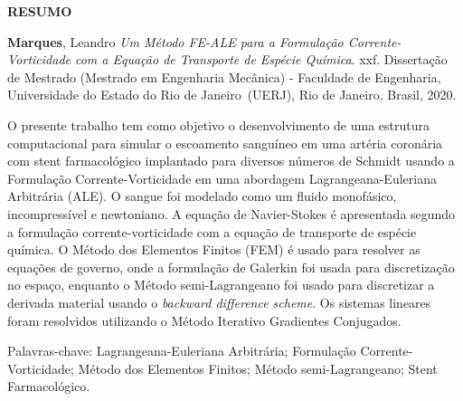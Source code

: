 \begin{center}
\textbf{RESUMO}
\end{center}


$\!$\\

\hspace{-1.3cm}\textbf{Marques}, Leandro \textit{Um Método FE-ALE para a Formulação Corrente-Vorticidade com a Equação de Transporte de Espécie Química}. xxf. Dissertação de Mestrado (Mestrado em Engenharia Mecânica) - Faculdade de Engenharia, Universidade do Estado do Rio de Janeiro~(UERJ), Rio de Janeiro, Brasil, 2020.

\vspace{.2cm}

\indent 
O presente trabalho tem como objetivo o desenvolvimento 
de uma estrutura computacional para simular o escoamento 
sanguíneo em uma artéria coronária com stent farmacológico 
implantado para diversos números de Schmidt usando a Formulação Corrente-Vorticidade em uma 
abordagem Lagrangeana-Euleriana Arbitrária (ALE).
O sangue foi modelado como um fluido monofásico, incompressível e newtoniano.
A equação de Navier-Stokes é apresentada segundo a formulação 
corrente-vorticidade com a equação de transporte de espécie química.
O Método dos Elementos Finitos (FEM) é usado para resolver as equações 
de governo, onde a formulação de Galerkin foi usada para 
discretização no espaço, enquanto o Método semi-Lagrangeano 
foi usado para discretizar a derivada material usando 
o \textit{backward difference scheme}. 
Os sistemas lineares foram resolvidos utilizando o 
Método Iterativo Gradientes Conjugados.

\vspace{1cm}

\hspace{-1.3cm}Palavras-chave: Lagrangeana-Euleriana Arbitrária; Formulação Corrente-Vorticidade; Método dos Elementos Finitos; Método semi-Lagrangeano; Stent Farmacológico.
